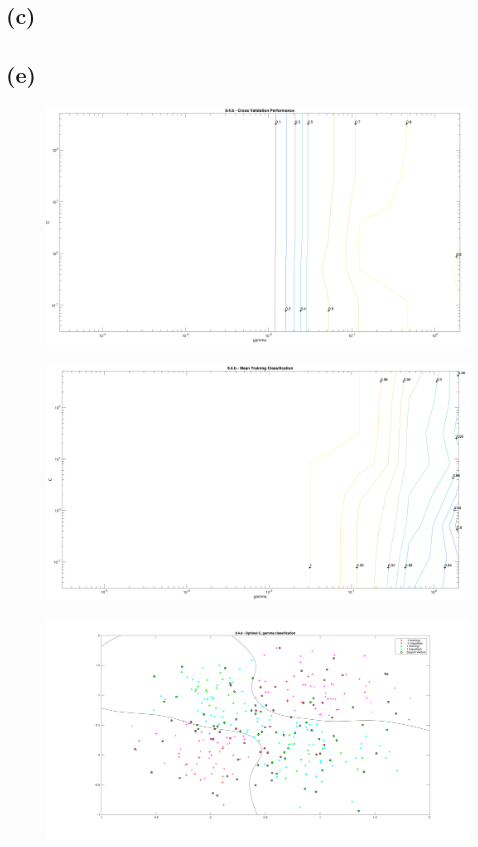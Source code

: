 \documentclass[11pt,a4paper]{article}
\begin{document}
\subsection*{(c)}

\subsection*{(e)}

\begin{figure}[h]
	\includegraphics[angle=270,width=\textwidth]{94b_1.png}
	\centering
\end{figure}
\begin{figure}[h]
	\includegraphics[angle=270,width=\textwidth]{94b_2.png}
	\centering
\end{figure}
\begin{figure}[h]
	\includegraphics[angle=270,width=\linewidth]{94d.png}
	\centering
\end{figure}
\end{document}
